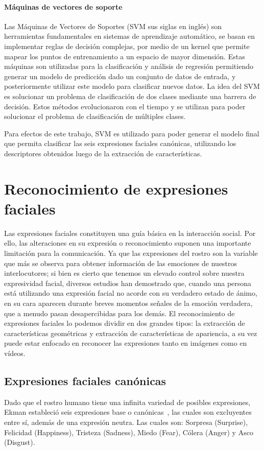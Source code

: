 	\paragraph{Máquinas de vectores de soporte}
	\label{sec:svm}
	Las Máquinas de Vectores de Soportes (SVM sus siglas en inglés) son herramientas fundamentales en sistemas de aprendizaje automático, se basan en  implementar reglas de decisión complejas, por medio de un kernel que permite mapear los puntos de entrenamiento a un espacio de mayor dimensión. Estas máquinas son utilizadas para la clasificación y análisis de regresión permitiendo generar un modelo de predicción dado un conjunto de datos de entrada, y posteriormente utilizar este modelo para clasificar nuevos datos.
La idea del SVM es solucionar un problema de clasificación de dos clases mediante una barrera de decisión. Estos métodos evolucionaron con el tiempo y se utilizan para poder solucionar el problema de clasificación de múltiples clases.

Para efectos de este trabajo, SVM es utilizado para poder generar el modelo final que permita clasificar las seis expresiones faciales canónicas, utilizando los descriptores obtenidos luego de la extracción de características.

\section{Reconocimiento de expresiones faciales}
\label{sec:fer}
Las expresiones faciales constituyen una guía básica en la interacción social. Por ello, las alteraciones en su expresión o reconocimiento suponen una importante limitación para la comunicación. Ya que las expresiones del rostro son la variable que más se observa para obtener información de las emociones de nuestros interlocutores; si bien es cierto que tenemos un elevado control sobre nuestra expresividad facial, diversos estudios han demostrado que, cuando una persona está utilizando una expresión facial no acorde con su verdadero estado de ánimo, en su cara aparecen durante breves momentos señales de la emoción verdadera, que a menudo pasan desapercibidas para los demás.
El reconocimiento de expresiones faciales lo podemos dividir en dos grandes tipos: la extracción de características geométricas y extracción de características de apariencia, a su vez puede estar enfocado en reconocer las expresiones tanto en imágenes como en vídeos.  


\subsection{Expresiones faciales canónicas}
\label{sec:type_fe}
Dado que el rostro humano tiene una infinita variedad de posibles expresiones, Ekman estableció seis expresiones base o canónicas~\cite{Ekman1981}, las cuales son excluyentes entre sí, además de una expresión neutra. Las cuales son: Sorpresa (Surprise), Felicidad (Happiness), Tristeza (Sadness), Miedo (Fear), Cólera (Anger) y Asco (Disgust).


